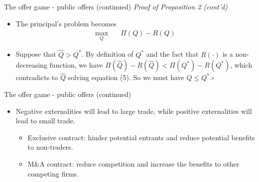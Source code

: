 \documentclass[aspectratio=169]{beamer}  %
\begin{document}
\begin{frame}{The offer game - public offers (continued)}
    \textit{Proof of Proposition 2 (cont'd)} \vspace{.2cm}
    \begin{itemize}
        \item The principal's problem becomes \vspace{.2cm}
        \begin{align*}
            \max_{Q} & \quad \Pi(Q) - R(Q)
        \end{align*}
        \item Suppose that $\hat{Q}>Q^*$. By definition of $Q^*$ and the fact that $R(\cdot)$ is a non-decreasing function, we have $\Pi(\hat{Q}) - R(\hat{Q}) < \Pi(Q^*) - R(Q^*)$, which contradicts to $\hat{Q}$ solving equation (5). So we must have $\hat{Q}\leq Q^*$.\hfill$\square$ \vspace{.2cm}
    \end{itemize}
\end{frame}



\begin{frame}{The offer game - public offers (continued)}
    \begin{itemize}
        \item Negative externalities will lead to large trade, while positive externalities will lead to small trade. \vspace{.2cm}
        \begin{itemize}
            \item Exclusive contract: hinder potential entrants and reduce potential benefits to non-traders. \vspace{.2cm}
            \item M\&A contract: reduce competition and increase the benefits to other competing firms. \vspace{.2cm}           
        \end{itemize}
    \end{itemize}

\end{frame}
\end{document}
